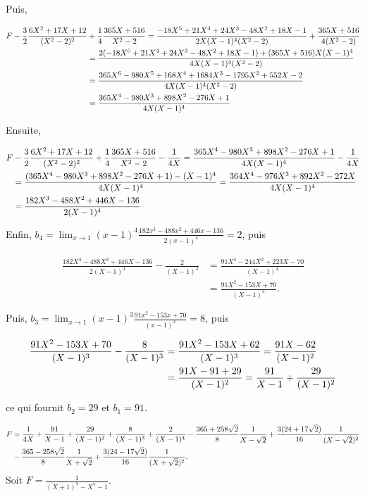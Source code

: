 {{Puis,

\begin{align*}\ensuremath
F-\frac{3}{2}\frac{6X^2+17X+12}{(X^2-2)^2}&+\frac{1}{4}\frac{365X+516}{X^2-2}=
\frac{-18X^5+21X^4+24X^3-48X^2+18X-1}{2X(X-1)^4(X^2-2)}+\frac{365X+516}{4(X^2-2)}\\
 &=\frac{2(-18X^5+21X^4+24X^3-48X^2+18X-1)+(365X+516)X(X-1)^4}{4X(X-1)^4(X^2-2)}\\
 &=\frac{365X^6-980X^5+168X^4+1684X^3-1795X^2+552X-2}{4X(X-1)^4(X^2-2)}\\
 &=\frac{365X^4-980X^3+898X^2-276X+1}{4X(X-1)^4}
\end{align*}

Ensuite,

\begin{align*}\ensuremath
F&-\frac{3}{2}\frac{6X^2+17X+12}{(X^2-2)^2}+\frac{1}{4}\frac{365X+516}{X^2-2}-\frac{1}{4X}=
\frac{365X^4-980X^3+898X^2-276X+1}{4X(X-1)^4}-\frac{1}{4X}\\
 &=\frac{(365X^4-980X^3+898X^2-276X+1)-(X-1)^4}{4X(X-1)^4}=\frac{364X^4-976X^3+892X^2-272X}{4X(X-1)^4}\\
 &=\frac{182X^3-488X^2+446X-136}{2(X-1)^4}
\end{align*}

Enfin, $b_4=\lim_{x\rightarrow 1}(x-1)^4\frac{182x^3-488x^2+446x-136}{2(x-1)^4}=2$, puis

\begin{align*}
\frac{182X^3-488X^2+446X-136}{2(X-1)^4}-\frac{2}{(X-1)^4} &= \frac{91X^3-244X^2+223X-70}{(X-1)^4} \\
&= \frac{91X^2-153X+70}{(X-1)^3}.
\end{align*}

Puis, $b_3=\lim_{x\rightarrow 1}(x-1)^3\frac{91x^2-153x+70}{(x-1)^3}=8$, puis

\begin{align*}\ensuremath
\frac{91X^2-153X+70}{(X-1)^3}-\frac{8}{(X-1)^3}&=\frac{91X^2-153X+62}{(X-1)^3}=\frac{91X-62}{(X-1)^2}\\
 &=\frac{91X-91+29}{(X-1)^2}=\frac{91}{X-1}+\frac{29}{(X-1)^2}
\end{align*}

ce qui fournit $b_2=29$ et $b_1=91$.

\begin{align*}\ensuremath
F&=\frac{1}{4X}+\frac{91}{X-1}+\frac{29}{(X-1)^2}+\frac{8}{(X-1)^3}+\frac{2}{(X-1)^4}
-\frac{365+258\sqrt{2}}{8}\frac{1}{X-\sqrt{2}}+\frac{3(24+17\sqrt{2})}{16}\frac{1}{(X-\sqrt{2})^2}\\
 &-\frac{365-258\sqrt{2}}{8}\frac{1}{X+\sqrt{2}}+\frac{3(24-17\sqrt{2})}{16}\frac{1}{(X+\sqrt{2})^2}.
\end{align*}
Soit $F=\frac{1}{(X+1)^7-X^7-1}$.

}}
